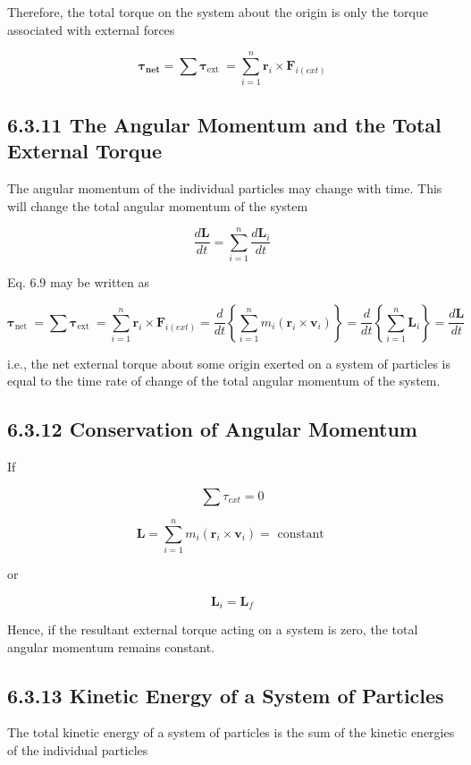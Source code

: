 \documentclass[10pt]{article}
\begin{document}
Therefore, the total torque on the system about the origin is only the torque associated with external forces


\begin{equation*}
\boldsymbol{\tau}_{\boldsymbol{n e t}}=\sum \boldsymbol{\tau}_{\text {ext }}=\sum_{i=1}^{n} \mathbf{r}_{i} \times \mathbf{F}_{i(e x t)} \tag{6.9}
\end{equation*}


\subsection*{6.3.11 The Angular Momentum and the Total External Torque}
The angular momentum of the individual particles may change with time. This will change the total angular momentum of the system

$$
\frac{d \mathbf{L}}{d t}=\sum_{i=1}^{n} \frac{d \mathbf{L}_{i}}{d t}
$$

Eq. 6.9 may be written as

$$
\boldsymbol{\tau}_{\text {net }}=\sum \boldsymbol{\tau}_{\text {ext }}=\sum_{i=1}^{n} \mathbf{r}_{i} \times \mathbf{F}_{i(e x t)}=\frac{d}{d t}\left\{\sum_{i=1}^{n} m_{i}\left(\mathbf{r}_{i} \times \mathbf{v}_{i}\right)\right\}=\frac{d}{d t}\left\{\sum_{i=1}^{n} \mathbf{L}_{i}\right\}=\frac{d \mathbf{L}}{d t}
$$

i.e., the net external torque about some origin exerted on a system of particles is equal to the time rate of change of the total angular momentum of the system.

\subsection*{6.3.12 Conservation of Angular Momentum}
If

$$
\sum \tau_{e x t}=0
$$

$$
\mathbf{L}=\sum_{i=1}^{n} m_{i}\left(\mathbf{r}_{i} \times \mathbf{v}_{i}\right)=\text { constant }
$$

or

$$
\mathbf{L}_{i}=\mathbf{L}_{f}
$$

Hence, if the resultant external torque acting on a system is zero, the total angular momentum remains constant.

\subsection*{6.3.13 Kinetic Energy of a System of Particles}
The total kinetic energy of a system of particles is the sum of the kinetic energies of the individual particles
\end{document}
